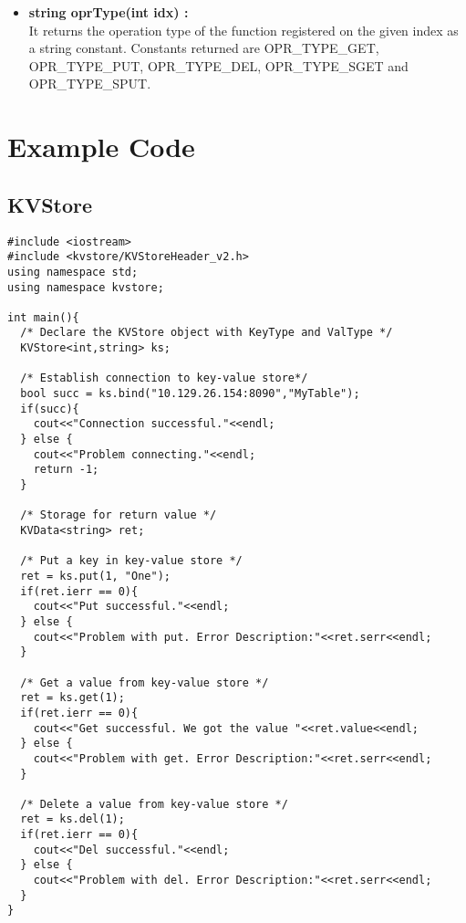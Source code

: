 \documentclass[11pt]{article}
\begin{document}
\begin{itemize}
\begin{itemize}
\item \textbf{string oprType(int idx) :}\\
It returns the operation type of the function registered on the given index as a string constant. Constants returned are OPR\_TYPE\_GET, OPR\_TYPE\_PUT, OPR\_TYPE\_DEL, OPR\_TYPE\_SGET and OPR\_TYPE\_SPUT.
\end{itemize}
\end{itemize}

\section{Example Code}
\subsection{KVStore}
\begin{lstlisting}
#include <iostream>
#include <kvstore/KVStoreHeader_v2.h>
using namespace std;
using namespace kvstore;

int main(){
  /* Declare the KVStore object with KeyType and ValType */
  KVStore<int,string> ks;
  
  /* Establish connection to key-value store*/
  bool succ = ks.bind("10.129.26.154:8090","MyTable");
  if(succ){
    cout<<"Connection successful."<<endl;
  } else {
    cout<<"Problem connecting."<<endl;
    return -1;
  }
  
  /* Storage for return value */
  KVData<string> ret;
  
  /* Put a key in key-value store */
  ret = ks.put(1, "One");
  if(ret.ierr == 0){
    cout<<"Put successful."<<endl;
  } else {
    cout<<"Problem with put. Error Description:"<<ret.serr<<endl;
  }
  
  /* Get a value from key-value store */
  ret = ks.get(1);
  if(ret.ierr == 0){
    cout<<"Get successful. We got the value "<<ret.value<<endl;
  } else {
    cout<<"Problem with get. Error Description:"<<ret.serr<<endl;
  }
  
  /* Delete a value from key-value store */
  ret = ks.del(1);
  if(ret.ierr == 0){
    cout<<"Del successful."<<endl;
  } else {
    cout<<"Problem with del. Error Description:"<<ret.serr<<endl;
  }
}
\end{lstlisting}
\end{document}
